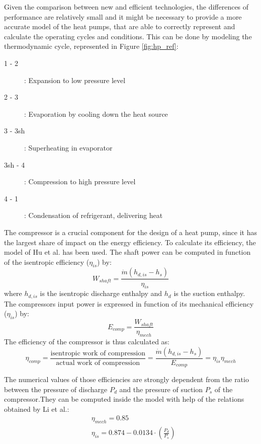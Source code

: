 \documentclass{article}
\begin{document}
Given the comparison between new and efficient technologies, the differences of performance are relatively small and it might be necessary to provide a more accurate model of the heat pumps, that are able to correctly represent and calculate the operating cycles and conditions. This can be done by modeling the thermodynamic cycle, represented in Figure \ref{fig:hp_ref}:

\begin{description}
	\item [1 - 2]: Expansion to low pressure level
	\item [2 - 3]: Evaporation by cooling down the heat source
	\item [3 - 3sh]: Superheating in evaporator
	\item [3sh - 4]: Compression to high pressure level
	\item [4 - 1]: Condensation of refrigerant, delivering heat
\end{description}

The compressor is a crucial component for the design of a heat pump, since it has the largest share of impact on the energy efficiency. To calculate its efficiency, the model of Hu et al.\cite{huExtremumSeekingControl2015} has been used. The shaft power can be computed in function of the isentropic efficiency ($\eta_{is}$) by:
\begin{equation}
W_{shaft} = \frac{\dot{m}(h_{d,is}-h_{s})}{\eta_{is}} 
\end{equation}
where $h_{d,is}$ is the isentropic discharge enthalpy and $h_{d}$ is the suction enthalpy. The compressors input power is expressed in function of its mechanical efficiency ($\eta_{is}$) by:
\begin{equation}
E_{comp} = \frac{W_{shaft}}{\eta_{mech}}  
\end{equation}
The efficiency of the compressor is thus calculated as:
\begin{equation}
\eta_{comp} = \frac{\text{isentropic work of compression}}{\text{actual work of compression}} = \frac{\dot{m}(h_{d,is}-h_{s})}{E_{comp}} = \eta_{is}\eta_{mech} 
\end{equation}

The numerical values of those efficiencies are strongly dependent from the ratio between the pressure of discharge $P_{d}$ and the pressure of suction $P_{s}$ of the compressor.They can be computed inside the model with help of the relations obtained by Li et al.\cite{liPerformanceCharacteristicsR1234yf2014}:
\begin{align}
& \eta_{mech} = 0.85\\
& \eta_{is} = 0.874-0.0134\cdot(\frac{P_{d}}{P_{s}})\\
\end{align}
		
\end{document}
